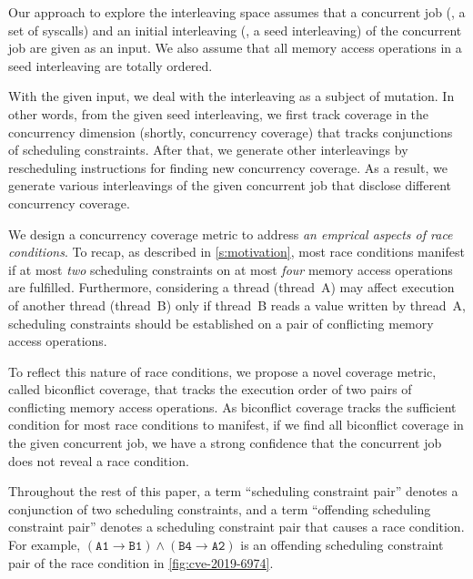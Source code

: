 

Our approach to explore the interleaving space assumes that a
concurrent job (\eg, a set of syscalls) and an initial interleaving
(\ie, a seed interleaving) of the concurrent job are given as an
input. We also assume that all memory access operations in a seed
interleaving are totally ordered.

With the given input, we deal with the interleaving as a subject of
mutation. In other words, from the given seed interleaving, we first
track coverage in the concurrency dimension (shortly, concurrency
coverage) that tracks conjunctions of scheduling constraints. After
that, we generate other interleavings by rescheduling instructions for
finding new concurrency coverage.
%
As a result, we generate various interleavings of the given concurrent
job that disclose different concurrency coverage.
%
%

%
We design a concurrency coverage metric to address \textit{an emprical
  aspects of race conditions}.
%
To recap, as described in \autoref{s:motivation}, most race conditions
manifest if at most \textit{two} scheduling constraints on at most
\textit{four} memory access operations are fulfilled.
%
Furthermore, considering a thread (thread~A) may affect execution of
another thread (thread~B) only if thread~B reads a value written by
thread~A, scheduling constraints should be established on a pair of
conflicting memory access operations.

To reflect this nature of race conditions, we propose a novel coverage
metric, called biconflict coverage, that tracks the execution order of
two pairs of conflicting memory access operations.
%
As biconflict coverage tracks the sufficient condition for most race
conditions to manifest, if we find all biconflict coverage in the
given concurrent job, we have a strong confidence that the concurrent
job does not reveal a race condition.

Throughout the rest of this paper, a term ``scheduling constraint
pair'' denotes a conjunction of two scheduling constraints, and a term
``offending scheduling constraint pair'' denotes a scheduling
constraint pair that causes a race condition.  For example,
$(\texttt{A1} \rightarrow \texttt{B1}) \wedge (\texttt{B4} \rightarrow
\texttt{A2})$ is an offending scheduling constraint pair of the race
condition in \autoref{fig:cve-2019-6974}.

